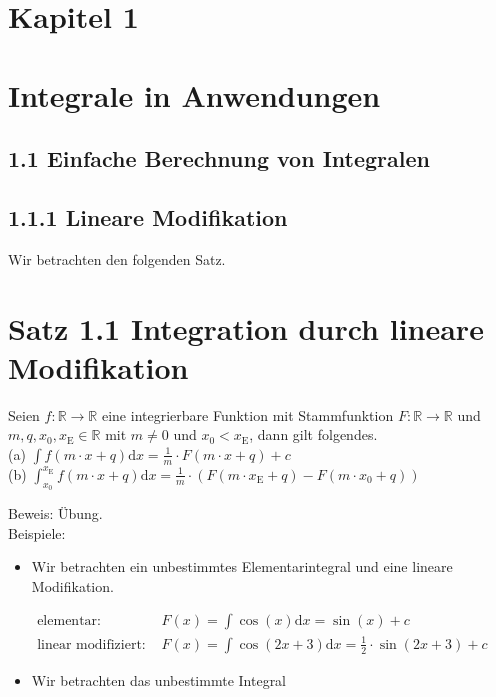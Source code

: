 \documentclass[10pt]{article}
\begin{document}
\section*{Kapitel 1}
\section*{Integrale in Anwendungen}
\subsection*{1.1 Einfache Berechnung von Integralen}
\subsection*{1.1.1 Lineare Modifikation}
Wir betrachten den folgenden Satz.

\section*{Satz 1.1 Integration durch lineare Modifikation}
Seien $f: \mathbb{R} \rightarrow \mathbb{R}$ eine integrierbare Funktion mit Stammfunktion $F: \mathbb{R} \rightarrow \mathbb{R}$ und $m, q, x_{0}, x_{\mathrm{E}} \in \mathbb{R}$ mit $m \neq 0$ und $x_{0}<x_{\mathrm{E}}$, dann gilt folgendes.\\
(a) $\int f(m \cdot x+q) \mathrm{d} x=\frac{1}{m} \cdot F(m \cdot x+q)+c$\\
(b) $\int_{x_{0}}^{x_{\mathrm{E}}} f(m \cdot x+q) \mathrm{d} x=\frac{1}{m} \cdot\left(F\left(m \cdot x_{\mathrm{E}}+q\right)-F\left(m \cdot x_{0}+q\right)\right)$

Beweis: Übung.\\
Beispiele:

\begin{itemize}
  \item Wir betrachten ein unbestimmtes Elementarintegral und eine lineare Modifikation.
\end{itemize}


\begin{align*}
\text { elementar: } & F(x)=\int \cos (x) \mathrm{d} x=\sin (x)+c \\
\text { linear modifiziert: } & F(x)=\int \cos (2 x+3) \mathrm{d} x=\frac{1}{2} \cdot \sin (2 x+3)+c \tag{1.1}
\end{align*}


\begin{itemize}
  \item Wir betrachten das unbestimmte Integral
\end{itemize}
\end{document}
